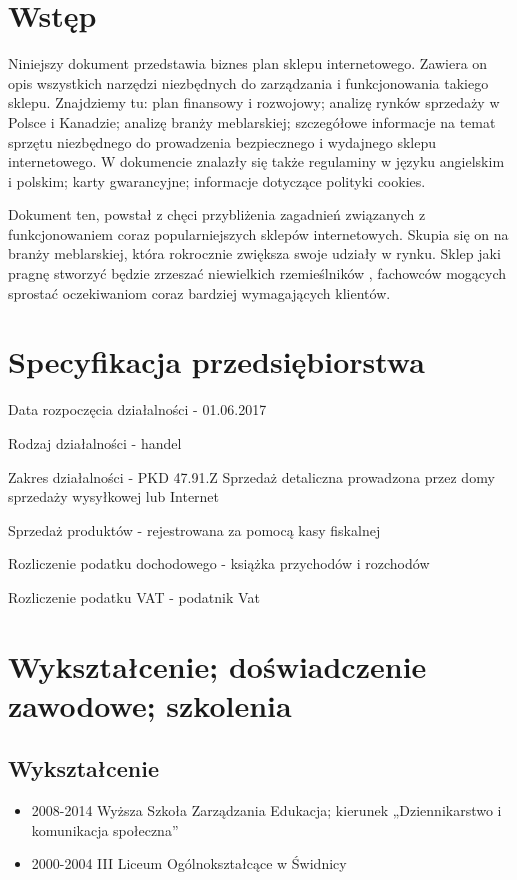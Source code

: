 	\section{Wstęp} 
		\par Niniejszy dokument przedstawia biznes plan sklepu internetowego. Zawiera on opis wszystkich narzędzi niezbędnych do zarządzania i funkcjonowania takiego sklepu. Znajdziemy tu: plan finansowy i rozwojowy; analizę rynków sprzedaży w Polsce i Kanadzie; analizę branży meblarskiej; szczegółowe informacje na temat sprzętu niezbędnego do prowadzenia bezpiecznego i wydajnego sklepu internetowego. W dokumencie znalazły się także regulaminy w języku angielskim i polskim; karty gwarancyjne; informacje dotyczące polityki cookies. 
	
		\par Dokument ten, powstał z chęci przybliżenia zagadnień związanych z funkcjonowaniem coraz popularniejszych sklepów internetowych. Skupia się on na branży meblarskiej, która rokrocznie zwiększa swoje udziały w rynku. Sklep jaki pragnę stworzyć będzie zrzeszać niewielkich rzemieślników , fachowców mogących sprostać oczekiwaniom coraz bardziej wymagających klientów.
	
	\section{Specyfikacja przedsiębiorstwa}
		\begin{description}
			\item Data rozpoczęcia działalności - 01.06.2017
			\item Rodzaj działalności - handel
			\item Zakres działalności - PKD 47.91.Z  Sprzedaż detaliczna prowadzona przez domy sprzedaży wysyłkowej lub Internet	
			\item Sprzedaż produktów - rejestrowana za pomocą kasy fiskalnej
			\item Rozliczenie podatku dochodowego - książka przychodów i rozchodów
			\item Rozliczenie podatku VAT - podatnik Vat
		\end{description}
	
	\section{Wykształcenie; doświadczenie zawodowe; szkolenia}
	\subsection{Wykształcenie}
		\begin{itemize}
			\item 2008-2014 Wyższa Szkoła Zarządzania Edukacja; kierunek „Dziennikarstwo i komunikacja społeczna”
         \item 2000-2004 III Liceum Ogólnokształcące w Świdnicy 
		\end{itemize}
		

